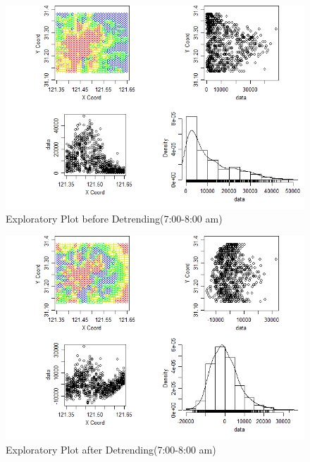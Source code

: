 \documentclass[hidelinks,12pt]{article}
\begin{document}
\begin{figure}[!ht]
		\includegraphics[width=\textwidth]{geo7.png}
		\caption{Exploratory Plot before Detrending(7:00-8:00 am) \label{fig:geo7}}
\end{figure}
\FloatBarrier

\begin{figure}[!ht]
		\includegraphics[width=\textwidth]{gres7.png}
		\caption{Exploratory Plot after Detrending(7:00-8:00 am)\label{fig:gres7}}
\end{figure}
\FloatBarrier
\end{document}
